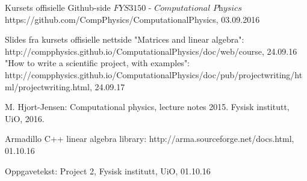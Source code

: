 \documentclass{article}
\begin{document}

\begin{thebibliography}{9}  

\bibitem{}
  Kursets offisielle Github-side $\textit{FYS3150 - Computational Physics}$
  https://github.com/CompPhysics/ComputationalPhysics,
  03.09.2016  
  
\bibitem{}
  Slides fra kursets offisielle nettside
  "Matrices and linear algebra":
   http://compphysics.github.io/ComputationalPhysics/doc/web/course, 24.09.16
  "How to write a scientific project, with examples":
  http://compphysics.github.io/ComputationalPhysics/doc/pub/projectwriting/html/projectwriting.html, 24.09.17
   
\bibitem{}
   M. Hjort-Jensen: Computational physics, lecture notes 2015. Fysisk institutt, UiO, 2016.
   
\bibitem{}
     Armadillo C++ linear algebra library:
     http://arma.sourceforge.net/docs.html, 01.10.16

\bibitem{}
   Oppgavetekst: Project 2, Fysisk institutt, UiO, 01.10.16
   
\end{thebibliography}
\end{document}
